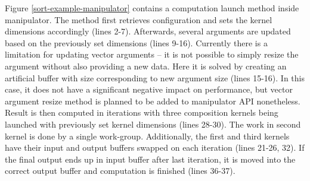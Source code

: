 \documentclass
[
    digital, %
    oneside, %
    table, %
    nolof, %
    nolot, %
    nocover %
]{fithesis3}
\begin{document}
Figure \ref{sort-example-manipulator} contains a computation launch method inside manipulator. The method first retrieves configuration and sets the kernel dimensions
accordingly (lines 2-7). Afterwards, several arguments are updated based on the previously set dimensions (lines 9-16). Currently there is a limitation
for updating vector arguments -- it is not possible to simply resize the argument without also providing a new data. Here it is solved by creating an artificial
buffer with size corresponding to new argument size (lines 15-16). In this case, it does not have a significant negative impact on performance, but vector
argument resize method is planned to be added to manipulator API nonetheless. Result is then computed in iterations with three composition kernels being
launched with previously set kernel dimensions (lines 28-30). The work in second kernel is done by a single work-group. Additionally, the first and third
kernels have their input and output buffers swapped on each iteration (lines 21-26, 32). If the final output ends up in input buffer after last iteration,
it is moved into the correct output buffer and computation is finished (lines 36-37).
\end{document}
